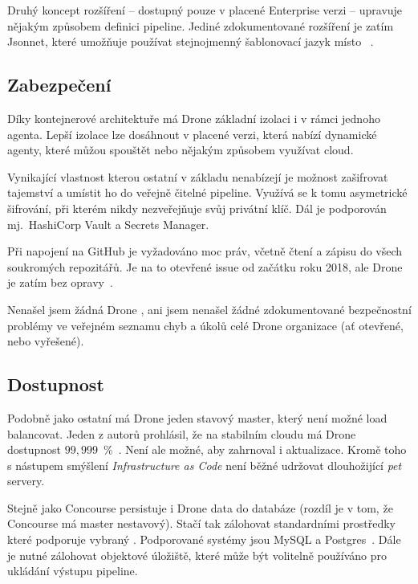         Druhý koncept rozšíření -- dostupný pouze v placené Enterprise verzi -- upravuje nějakým způsobem definici pipeline. Jediné zdokumentované rozšíření je zatím Jsonnet, které umožňuje používat stejnojmenný šablonovací jazyk místo ~\cite{drone-jsonnet}.

    \subsection{Zabezpečení}
        Díky kontejnerové architektuře má Drone základní izolaci i v rámci jednoho agenta. Lepší izolace lze dosáhnout v placené verzi, která nabízí dynamické agenty, které můžou spouštět  nebo nějakým způsobem využívat cloud.

        Vynikající vlastnost kterou ostatní v základu \CI nenabízejí je možnost zašifrovat tajemství a umístit ho do veřejně čitelné pipeline. Využívá se k tomu asymetrické šifrování, při kterém \CI nikdy nezveřejňuje svůj privátní klíč. Dál je podporován mj.~HashiCorp Vault a  Secrets Manager.

        Při napojení na GitHub je vyžadováno moc práv, včetně čtení a zápisu do všech soukromých repozitářů. Je na to otevřené issue od začátku roku 2018, ale Drone je zatím bez opravy~\cite{drone-github-acl}.

        Nenašel jsem žádná Drone , ani jsem nenašel žádné zdokumentované bezpečnostní problémy ve veřejném seznamu chyb a úkolů celé Drone organizace (ať otevřené, nebo vyřešené).

    \subsection{Dostupnost}
        Podobně jako ostatní \CI má Drone jeden stavový master, který není možné load balancovat. Jeden z autorů prohlásil, že na stabilním cloudu má Drone dostupnost $99,999$~\%~\cite{drone-ha}. Není ale možné, aby zahrnoval i aktualizace. Kromě toho s nástupem smýšlení \textit{Infrastructure as Code} není běžné udržovat dlouhožijící \textit{pet} servery.

        Stejně jako Concourse persistuje i Drone data do databáze (rozdíl je v tom, že Concourse má master nestavový). Stačí tak zálohovat standardními prostředky které podporuje vybraný . Podporované systémy jsou MySQL a Postgres~\cite{drone-database}. Dále je nutné zálohovat objektové úložiště, které může být volitelně používáno pro ukládání výstupu pipeline.

